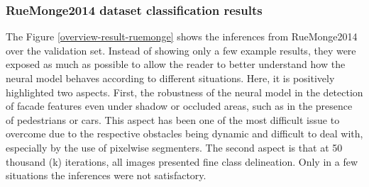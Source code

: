 \subsubsection{RueMonge2014 dataset classification results}
The Figure \ref{overview-result-ruemonge} shows the inferences from RueMonge2014 over the validation set. Instead of showing only a few example results, they were exposed as much as possible to allow the reader to better understand how the neural model behaves according to different situations. Here, it is positively highlighted two aspects. First, the robustness of the neural model in the detection of facade features even under shadow or occluded areas, such as in the presence of pedestrians or cars. This aspect has been one of the most difficult issue to overcome due to the respective obstacles being dynamic and difficult to deal with, especially by the use of pixelwise segmenters. The second aspect is that at 50 thousand (k) iterations, all images presented fine class delineation. Only in a few situations the inferences were not satisfactory. 
